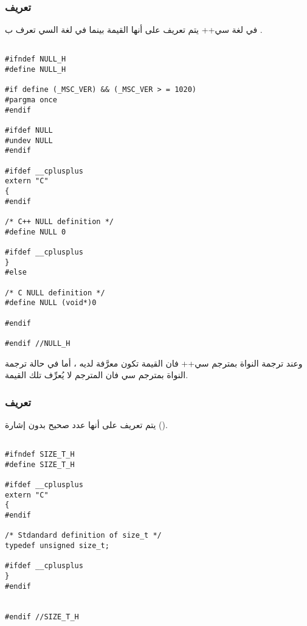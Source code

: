 \documentclass[document.tex]{subfiles}
\begin{document}
\subsubsection{تعريف }
في لغة سي++ يتم تعريف  على أنها القيمة  بينما في لغة السي تعرف ب .
\begin{english}

\lstset{numberstyle=\tiny,numbers=left,stepnumber=1,numbersep=5pt,tabsize=2,extendedchars=true,breaklines=true,frame=b,showspaces=false, showtabs=false,xleftmargin=10pt,framexleftmargin=10pt,framexrightmargin=5pt,framexbottommargin=4pt,showstringspaces=false,language=C++}

\begin{lstlisting}[label=null_def,caption=\en{null.h:Definition of NULL in C and C++}]

#ifndef NULL_H
#define NULL_H

#if define (_MSC_VER) && (_MSC_VER > = 1020)
#pargma once
#endif

#ifdef NULL
#undev NULL
#endif

#ifdef __cplusplus
extern "C"
{
#endif

/* C++ NULL definition */
#define NULL 0

#ifdef __cplusplus
}
#else

/* C NULL definition */
#define NULL (void*)0

#endif

#endif //NULL_H
\end{lstlisting}
\end{english}

وعند ترجمة النواة بمترجم سي++ فان القيمة  تكون معرَّفة لديه ، أما في حالة ترجمة النواة بمترجم سي فان المترجم لا يُعرِّف تلك القيمة.

\subsubsection{تعريف }
يتم تعريف  على أنها عدد صحيح  بدون إشارة ().

\begin{english}

\lstset{numberstyle=\tiny,numbers=left,stepnumber=1,numbersep=5pt,tabsize=2,extendedchars=true,breaklines=true,frame=b,showspaces=false, showtabs=false,xleftmargin=10pt,framexleftmargin=10pt,framexrightmargin=5pt,framexbottommargin=4pt,showstringspaces=false,language=C++}

\begin{lstlisting}[label=sizet_def,caption=\en{size\_t.h:Definition of size\_t in C/C++}]

#ifndef SIZE_T_H
#define SIZE_T_H

#ifdef __cplusplus
extern "C"
{
#endif

/* Stdandard definition of size_t */
typedef unsigned size_t;

#ifdef __cplusplus
}
#endif


#endif //SIZE_T_H

\end{lstlisting}
\end{english}
\end{document}
